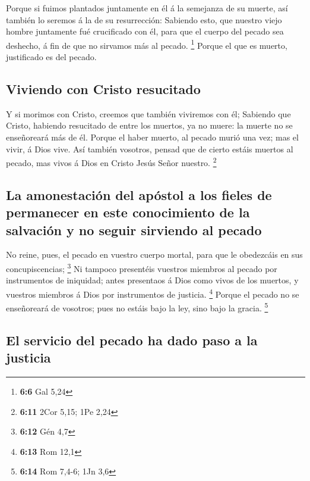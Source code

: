  Porque si fuimos plantados juntamente en él á la
semejanza de su muerte, así también lo seremos á la de su resurrección:
 Sabiendo esto, que nuestro viejo hombre juntamente fué
crucificado con él, para que el cuerpo del pecado sea deshecho, á fin de
que no sirvamos más al pecado. \footnote{\textbf{6:6} Gal 5,24}
 Porque el que es muerto, justificado es del pecado.

\hypertarget{viviendo-con-cristo-resucitado}{%
\subsection{Viviendo con Cristo
resucitado}\label{viviendo-con-cristo-resucitado}}

 Y si morimos con Cristo, creemos que también viviremos
con él;  Sabiendo que Cristo, habiendo resucitado de entre
los muertos, ya no muere: la muerte no se enseñoreará más de él.
 Porque el haber muerto, al pecado murió una vez; mas el
vivir, á Dios vive.  Así también vosotros, pensad que de
cierto estáis muertos al pecado, mas vivos á Dios en Cristo Jesús Señor
nuestro. \footnote{\textbf{6:11} 2Cor 5,15; 1Pe 2,24}

\hypertarget{la-amonestaciuxf3n-del-apuxf3stol-a-los-fieles-de-permanecer-en-este-conocimiento-de-la-salvaciuxf3n-y-no-seguir-sirviendo-al-pecado}{%
\subsection{La amonestación del apóstol a los fieles de permanecer en
este conocimiento de la salvación y no seguir sirviendo al
pecado}\label{la-amonestaciuxf3n-del-apuxf3stol-a-los-fieles-de-permanecer-en-este-conocimiento-de-la-salvaciuxf3n-y-no-seguir-sirviendo-al-pecado}}

 No reine, pues, el pecado en vuestro cuerpo mortal, para
que le obedezcáis en sus concupiscencias; \footnote{\textbf{6:12} Gén
  4,7}  Ni tampoco presentéis vuestros miembros al pecado
por instrumentos de iniquidad; antes presentaos á Dios como vivos de los
muertos, y vuestros miembros á Dios por instrumentos de justicia.
\footnote{\textbf{6:13} Rom 12,1}  Porque el pecado no se
enseñoreará de vosotros; pues no estáis bajo la ley, sino bajo la
gracia. \footnote{\textbf{6:14} Rom 7,4-6; 1Jn 3,6}

\hypertarget{el-servicio-del-pecado-ha-dado-paso-a-la-justicia}{%
\subsection{El servicio del pecado ha dado paso a la
justicia}\label{el-servicio-del-pecado-ha-dado-paso-a-la-justicia}}

